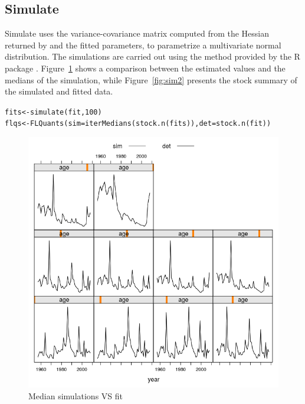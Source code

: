 \documentclass[a4paper,english,10pt]{article}\usepackage[]{graphicx}\usepackage[]{color}
\makeatletter
\newcommand{\hlnum}[1]{\textcolor[rgb]{0.063,0.58,0.627}{#1}}%
\newcommand{\hlstd}[1]{\textcolor[rgb]{0.196,0.196,0.196}{#1}}%
\newcommand{\hlkwb}[1]{\textcolor[rgb]{0.627,0,0.314}{#1}}%
\newcommand{\hlkwc}[1]{\textcolor[rgb]{0,0.631,0.314}{#1}}%
\newcommand{\hlkwd}[1]{\textcolor[rgb]{0.78,0.227,0.412}{#1}}%
\newenvironment{kframe}{%
 \def\at@end@of@kframe{}%
 \ifinner\ifhmode%
  \def\at@end@of@kframe{\end{minipage}}%
  \begin{minipage}{\columnwidth}%
 \fi\fi%
 \def\FrameCommand##1{\hskip\@totalleftmargin \hskip-\fboxsep
 \colorbox{shadecolor}{##1}\hskip-\fboxsep
     \hskip-\linewidth \hskip-\@totalleftmargin \hskip\columnwidth}%
 \MakeFramed {\advance\hsize-\width
   \@totalleftmargin\z@ \linewidth\hsize
   \@setminipage}}%
 {\par\unskip\endMakeFramed%
 \at@end@of@kframe}
\newenvironment{knitrout}{}{} %
\makeatother
\begin{document}
\subsection{Simulate}

Simulate uses the variance-covariance matrix computed from the Hessian returned by  and the fitted parameters, to parametrize a multivariate normal distribution. The simulations are carried out using the method  provided by the R package \href{http://cran.r-project.org/web/packages/MASS/}{}. Figure~\ref{fig:sim} shows a comparison between the estimated values and the medians of the simulation, while Figure~\ref{fig:sim2} presents the stock summary of the simulated and fitted data.

\begin{knitrout}
\color{fgcolor}\begin{kframe}
\begin{alltt}
\hlstd{fits} \hlkwb{<-} \hlkwd{simulate}\hlstd{(fit,} \hlnum{100}\hlstd{)}
\hlstd{flqs} \hlkwb{<-} \hlkwd{FLQuants}\hlstd{(}\hlkwc{sim} \hlstd{=} \hlkwd{iterMedians}\hlstd{(}\hlkwd{stock.n}\hlstd{(fits)),} \hlkwc{det} \hlstd{=} \hlkwd{stock.n}\hlstd{(fit))}
\end{alltt}
\end{kframe}
\end{knitrout}

\begin{knitrout}
\color{fgcolor}\begin{figure}[H]

{\centering \includegraphics[width=.9\linewidth]{figure/sim-1} 

}

\caption[Median simulations VS fit]{Median simulations VS fit}\label{fig:sim}
\end{figure}


\end{knitrout}
\end{document}
